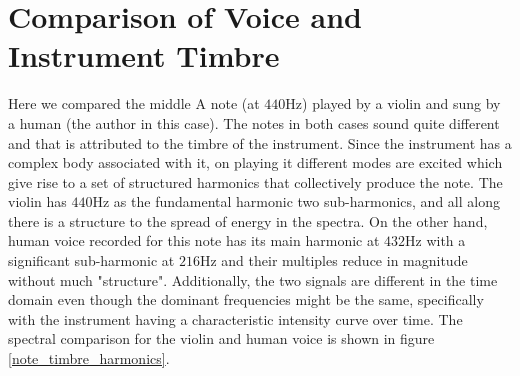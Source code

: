 \documentclass[10pt]{article}
\begin{document}
\section{Comparison of Voice and Instrument Timbre}
Here we compared the middle A note (at $440$Hz) played by a violin and sung by a human (the author in this case). The notes in both cases sound quite different and that is attributed to the timbre of the instrument. Since the instrument has a complex body associated with it, on playing it different modes are excited which give rise to a set of structured harmonics that collectively produce the note. The violin has $440$Hz as the fundamental harmonic two sub-harmonics, and all along there is a structure to the spread of energy in the spectra. On the other hand, human voice recorded for this note has its main harmonic at $432$Hz with a significant sub-harmonic at $216$Hz and their multiples reduce in magnitude without much "structure". Additionally, the two signals are different in the time domain even though the dominant frequencies might be the same, specifically with the instrument having a characteristic intensity curve over time. The spectral comparison for the violin and human voice is shown in figure \ref{note_timbre_harmonics}.
\end{document}
